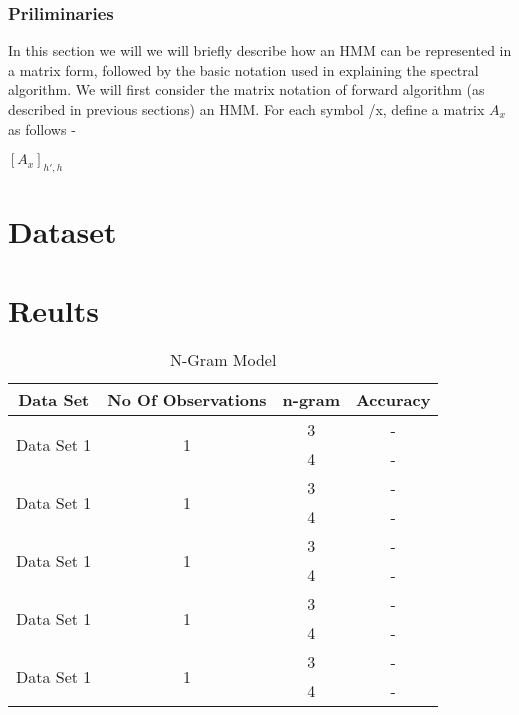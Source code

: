 \documentclass{article} %
\begin{document}
\subsubsection{Priliminaries}
In this section we will we will briefly describe how an HMM can be represented in a matrix form, followed by the basic notation used in explaining the spectral algorithm. 
\newline
We will first consider the matrix notation of forward algorithm (as described in previous sections) an HMM. For each symbol /x, define a matrix $A_x$ as follows -
\begin{center}
$[A_x]_{h',h}$
\end{center}



\section{Dataset}

\section{Reults}

\begin{table}[t]
\caption{N-Gram Model}
\label{N-Gram_model}
\begin{center}
\begin{tabular}{ |c|c|c|c| }
\hline
\multicolumn{1}{|c|}{\bf Data Set} &\multicolumn{1}{|c|}{\bf No Of Observations} &\multicolumn{1}{|c|}{\bf n-gram} &\multicolumn{1}{|c|}{\bf Accuracy}\\
\hline
\multirow{2}{*}{Data Set 1}& \multirow{2}{*}{1} & 3 & - \\
& & 4 & - \\
\hline
\multirow{2}{*}{Data Set 1}& \multirow{2}{*}{1} & 3 & - \\
& & 4 & - \\
\hline
\multirow{2}{*}{Data Set 1}& \multirow{2}{*}{1} & 3 & - \\
& & 4 & - \\
\hline
\multirow{2}{*}{Data Set 1}& \multirow{2}{*}{1} & 3 & - \\
& & 4 & - \\
\hline
\multirow{2}{*}{Data Set 1}& \multirow{2}{*}{1} & 3 & - \\
& & 4 & - \\
\hline
\end{tabular}
\end{center}
\end{table}
\end{document}
